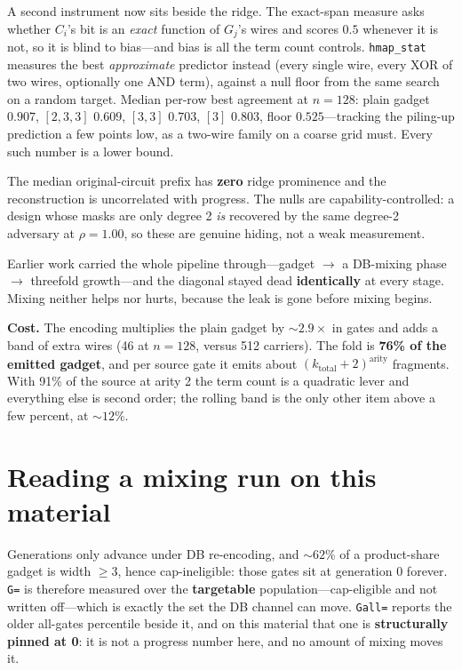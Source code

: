 \documentclass[11pt]{article}
\begin{document}
A second instrument now sits beside the ridge. The exact-span measure asks
whether $C_i$'s bit is an \emph{exact} function of $G_j$'s wires and scores
$0.5$ whenever it is not, so it is blind to bias---and bias is all the term
count controls. \texttt{hmap\_stat} measures the best \emph{approximate}
predictor instead (every single wire, every XOR of two wires, optionally one
AND term), against a null floor from the same search on a random target. Median
per-row best agreement at $n{=}128$: plain gadget $0.907$, $[2,3,3]$ $0.609$,
$[3,3]$ $0.703$, $[3]$ $0.803$, floor $0.525$---tracking the piling-up
prediction a few points low, as a two-wire family on a coarse grid must. Every
such number is a lower bound.

The median original-circuit prefix has \textbf{zero} ridge prominence and the
reconstruction is uncorrelated with progress. The nulls are
capability-controlled: a design whose masks are only degree 2 \emph{is} recovered
by the same degree-2 adversary at $\rho=1.00$, so these are genuine hiding, not
a weak measurement.

Earlier work carried the whole pipeline through---gadget $\to$ a DB-mixing phase
$\to$ threefold growth---and the diagonal stayed dead \textbf{identically} at
every stage. Mixing neither helps nor hurts, because the leak is gone before
mixing begins.

\textbf{Cost.} The encoding multiplies the plain gadget by ${\sim}2.9\times$ in
gates and adds a band of extra wires (46 at $n{=}128$, versus 512 carriers). The
fold is \textbf{76\% of the emitted gadget}, and per source gate it emits about
$(k_{\mathrm{total}}+2)^{\mathrm{arity}}$ fragments. With 91\% of the source at
arity 2 the term count is a quadratic lever and everything else is second order;
the rolling band is the only other item above a few percent, at ${\sim}12\%$.

\section{Reading a mixing run on this material}

Generations only advance under DB re-encoding, and ${\sim}62\%$ of a
product-share gadget is width $\ge 3$, hence cap-ineligible: those gates sit at
generation 0 forever. \texttt{G=} is therefore measured over the
\textbf{targetable} population---cap-eligible and not written off---which is
exactly the set the DB channel can move. \texttt{Gall=} reports the older
all-gates percentile beside it, and on this material that one is
\textbf{structurally pinned at 0}: it is not a progress number here, and no
amount of mixing moves it.
\end{document}
